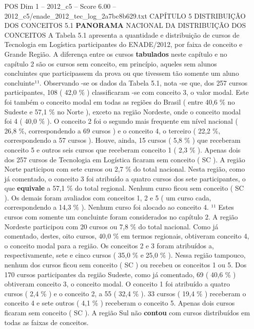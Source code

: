 \begin{textsample}{POS Dim 1 – 2012\_c5 – Score 6.00 – 2012\_c5/enade\_2012\_tec\_log\_2a7bc8b629.txt}  \label{ex:f1_pos_113}
CAPÍTULO 5 DISTRIBUIÇÃO DOS CONCEITOS 5.1 \textbf{PANORAMA} NACIONAL DA DISTRIBUIÇÃO DOS CONCEITOS A Tabela 5.1 apresenta a quantidade e distribuição de cursos de Tecnologia em Logística participantes do ENADE/2012, por faixa de conceito e Grande Região.
A diferença entre os cursos \textbf{tabulados} neste capítulo e no capítulo 2 são os cursos sem conceito, em princípio, aqueles sem alunos concluintes que participassem da prova ou que tivessem tão somente um aluno concluinte¹¹.
Observando -se os dados da Tabela 5.1, nota -se que, dos 257 cursos participantes, 108 ( 42,0 \% ) classificaram -se com conceito 3, o valor modal.
Este foi também o conceito modal em todas as regiões do Brasil ( entre 40,6 \% no Sudeste e 57,1 \% no Norte ), exceto na região Nordeste, onde o conceito modal foi 4 ( 40,0 \% ).
O conceito 2 foi o segundo mais frequente em nível nacional ( 26,8 \%, correspondendo a 69 cursos ) e o conceito 4, o terceiro ( 22,2 \%, correspondendo a 57 cursos ).
Houve, ainda, 15 cursos ( 5,8 \% ) que receberam conceito 5 e outros seis cursos que receberam conceito 1 ( 2,3 \% ).
Apenas dois dos 257 cursos de Tecnologia em Logística ficaram sem conceito ( SC ).
A região Norte participou com sete cursos ou 2,7 \% do total nacional.
Nesta região, como já comentado, o conceito 3 foi atribuído a quatro cursos dos sete participantes, o que \textbf{equivale} a 57,1 \% do total regional.
Nenhum curso ficou sem conceito ( SC ).
Os demais foram avaliados com conceitos 1, 2 e 5 ( um curso cada, correspondendo a 14,3 \% ).
Nenhum curso foi alocado ao conceito 4. ¹¹ Estes cursos com somente um concluinte foram considerados no capítulo 2.
A região Nordeste participou com 20 cursos ou 7,8 \% do total nacional.
Como já comentado, destes, oito cursos, 40,0 \% em termos regionais, obtiveram conceito 4, o conceito modal para a região.
Os conceitos 2 e 3 foram atribuídos a, respectivamente, sete e cinco cursos ( 35,0 \% e 25,0 \% ).
Nessa região tampouco, nenhum dos cursos ficou sem conceito ( SC ) ou recebeu os conceitos 1 ou 5.
Dos 170 cursos participantes da região Sudeste, como já comentado, 69 ( 40,6 \% ) obtiveram conceito 3, o conceito modal.
O conceito 1 foi atribuído a quatro cursos ( 2,4 \% ) e o conceito 2, a 55 ( 32,4 \% ). 33 cursos ( 19,4 \% ) receberam o conceito 4 e sete outros ( 4,1 \% ) receberam o conceito 5.
Apenas dois cursos ficaram sem conceito ( SC ).
A região Sul não \textbf{contou} com cursos distribuídos em todas as faixas de conceitos.

\end{textsample}

